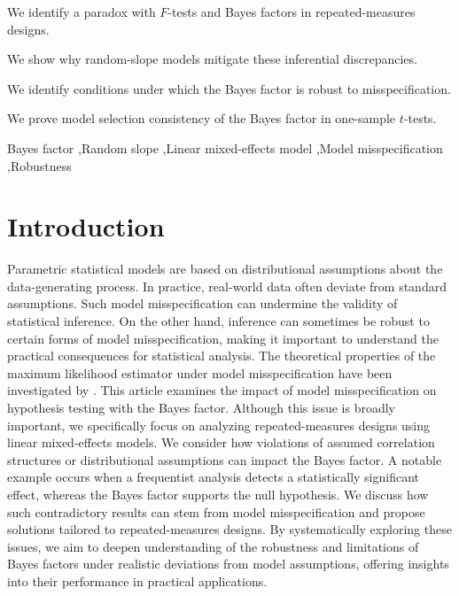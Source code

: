 \documentclass[preprint,12pt,authoryear]{elsarticle}
\begin{document}
\begin{frontmatter}
\begin{highlights}
\item We identify a paradox with $F$-tests and Bayes factors in repeated-measures designs.
\item We show why random-slope models mitigate these inferential discrepancies.
\item We identify conditions under which the Bayes factor is robust to misspecification.
\item We prove model selection consistency of the Bayes factor in one-sample $t$-tests.
\end{highlights}

\begin{keyword}
Bayes factor \sep Random slope \sep Linear mixed-effects model \sep Model misspecification \sep Robustness
\end{keyword}

\end{frontmatter}


\section{Introduction}
\label{sec1}

Parametric statistical models are based on distributional assumptions about the data-generating process. In practice, real-world data often deviate from standard assumptions. Such model misspecification can undermine the validity of statistical inference. On the other hand, inference can sometimes be robust to certain forms of model misspecification, making it important to understand the practical consequences for statistical analysis. The theoretical properties of the maximum likelihood estimator under model misspecification have been investigated by \citep{white_maximum_1982}. This article examines the impact of model misspecification on hypothesis testing with the Bayes factor. Although this issue is broadly important, we specifically focus on analyzing repeated-measures designs using linear mixed-effects models. We consider how violations of assumed correlation structures or distributional assumptions can impact the Bayes factor. A notable example occurs when a frequentist analysis detects a statistically significant effect, whereas the Bayes factor supports the null hypothesis. We discuss how such contradictory results can stem from model misspecification and propose solutions tailored to repeated-measures designs. By systematically exploring these issues, we aim to deepen understanding of the robustness and limitations of Bayes factors under realistic deviations from model assumptions, offering insights into their performance in practical applications.
\end{document}
